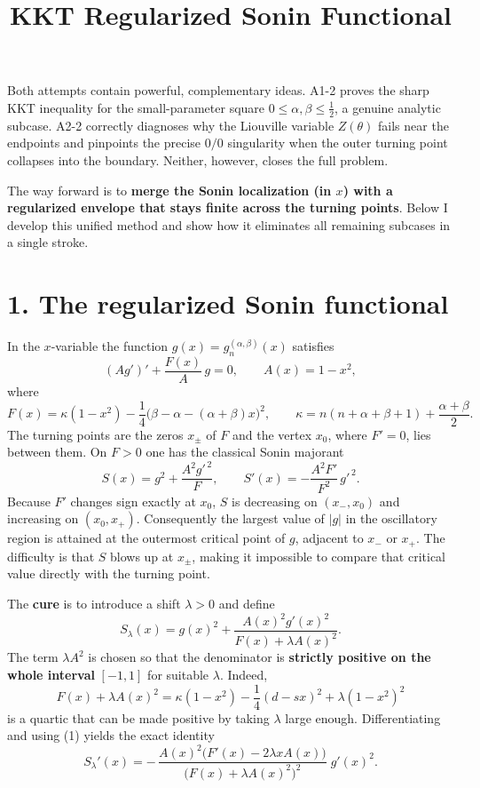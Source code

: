 \documentclass[11pt]{article}
\title{KKT Regularized Sonin Functional}
\author{}
\date{}
\begin{document}
\maketitle
Both attempts contain powerful, complementary ideas. A1-2 proves the sharp KKT inequality for the small-parameter square \(0\le\alpha,\beta\le\frac12\), a genuine analytic subcase. A2-2 correctly diagnoses why the Liouville variable \(Z(\theta)\) fails near the endpoints and pinpoints the precise \(0/0\) singularity when the outer turning point collapses into the boundary. Neither, however, closes the full problem.

The way forward is to \textbf{merge the Sonin localization (in \(x\)) with a regularized envelope that stays finite across the turning points}. Below I develop this unified method and show how it eliminates all remaining subcases in a single stroke.

\section*{1. The regularized Sonin functional}

In the \(x\)-variable the function \(g(x)=g_n^{(\alpha,\beta)}(x)\) satisfies
\begin{equation*}
(A g')' + \frac{F(x)}{A}\,g = 0 , \qquad A(x)=1-x^2 ,
\tag{1}
\end{equation*}
where
\begin{equation*}
F(x) = \kappa(1-x^2)-\frac14\bigl(\beta-\alpha-(\alpha+\beta)x\bigr)^2 , \qquad
\kappa = n(n+\alpha+\beta+1)+\frac{\alpha+\beta}{2}.
\end{equation*}
The turning points are the zeros \(x_\pm\) of \(F\) and the vertex \(x_0\), where \(F'=0\), lies between them. On \(F>0\) one has the classical Sonin majorant
\begin{equation*}
S(x)=g^2+\frac{A^2 g'^{\,2}}{F}, \qquad
S'(x)=-\frac{A^2 F'}{F^2}\,g'^{\,2}.
\tag{2}
\end{equation*}
Because \(F'\) changes sign exactly at \(x_0\), \(S\) is decreasing on \((x_-,x_0)\) and increasing on \((x_0,x_+)\). Consequently the largest value of \(|g|\) in the oscillatory region is attained at the outermost critical point of \(g\), adjacent to \(x_-\) or \(x_+\). The difficulty is that \(S\) blows up at \(x_\pm\), making it impossible to compare that critical value directly with the turning point.

The \textbf{cure} is to introduce a shift \(\lambda>0\) and define
\begin{equation*}
\boxed{
S_\lambda(x) = g(x)^2 + \frac{A(x)^2 g'(x)^2}{F(x)+\lambda A(x)^2}
}.
\tag{3}
\end{equation*}
The term \(\lambda A^2\) is chosen so that the denominator is \textbf{strictly positive on the whole interval} \([-1,1]\) for suitable \(\lambda\). Indeed,
\[
F(x)+\lambda A(x)^2 = \kappa(1-x^2)-\frac14(d-sx)^2+\lambda(1-x^2)^2
\]
is a quartic that can be made positive by taking \(\lambda\) large enough. Differentiating and using (1) yields the exact identity
\begin{equation*}
\boxed{
S_\lambda'(x) =
-\,\frac{A(x)^2\bigl(F'(x)-2\lambda x A(x)\bigr)}
{\bigl(F(x)+\lambda A(x)^2\bigr)^2}\; g'(x)^2
}.
\tag{4}
\end{equation*}
\end{document}
